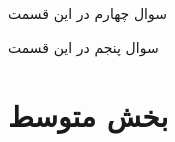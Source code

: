 \documentclass[12pt]{article}
\begin{document}
    \newpage
    
    \begin{problem}{سوال چهارم}
    	در این قسمت
    \end{problem}
    
    \begin{problem}{سوال پنجم}
    	در این قسمت
    \end{problem}
    
\section{بخش متوسط}
\end{document}
